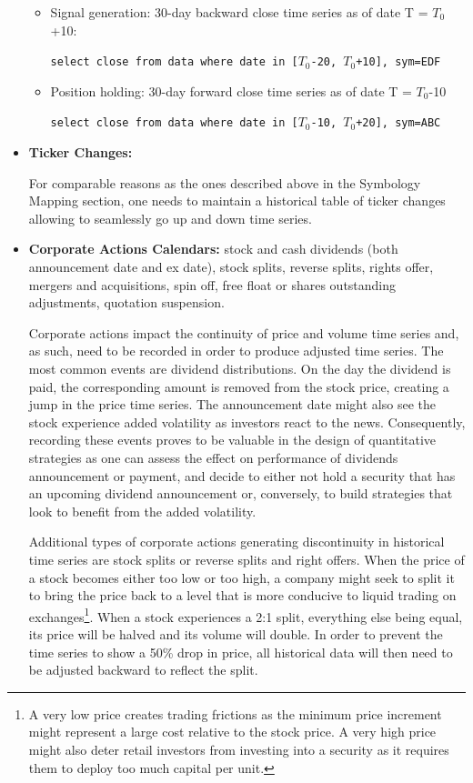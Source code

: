 \begin{itemize}
\begin{itemize}
\item Signal generation: 30-day backward close time series as of date T = $T_0$+10:

{\tt select close from data where date in [$T_0$-20,  $T_0$+10], sym=EDF}

\item Position holding: 30-day forward close time series as of date T = $T_0$-10

{\tt select close from data where date in [$T_0$-10,  $T_0$+20], sym=ABC}

\end{itemize}

\item \textbf{Ticker Changes:} 

For comparable reasons as the ones described above in the Symbology Mapping section, one needs to maintain a historical table of ticker changes allowing to seamlessly go up and down time series. 


\item \textbf{Corporate Actions Calendars:} stock and cash dividends (both announcement date and ex date), stock splits, reverse splits, rights offer, mergers and acquisitions, spin off, free float or shares outstanding adjustments, quotation suspension.

Corporate actions impact the continuity of price and volume time series and, as such, need to be recorded in order to produce adjusted time series. The most common events are dividend distributions. On the day the dividend is paid, the corresponding amount is removed from the stock price, creating a jump in the price time series. The announcement date might also see the stock experience added volatility as investors react to the news. Consequently, recording these events proves to be valuable in the design of quantitative strategies as one can assess the effect on performance of dividends announcement or payment, and decide to either not hold a security that has an upcoming dividend announcement or, conversely, to build strategies that look to benefit from the added volatility. 

Additional types of corporate actions generating discontinuity in historical time series are stock splits or reverse splits and right offers. When the price of a stock becomes either too low or too high, a company might seek to split it to bring the price back to a level that is more conducive to liquid trading on exchanges\footnote{A very low price creates trading frictions as the minimum price increment might represent a large cost relative to the stock price. A very high price might also deter retail investors from investing into a security as it requires them to deploy too much capital per unit.}. When a stock experiences a 2:1 split, everything else being equal, its price will be halved and its volume will double. In order to prevent the time series to show a 50\% drop in price, all historical data will then need to be adjusted backward to reflect the split.


\end{itemize}
